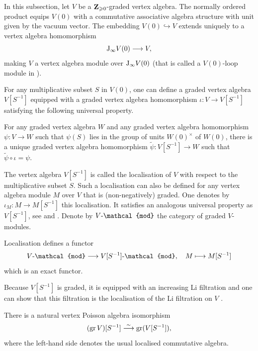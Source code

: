 In this subsection, let $V$ be a $\mathbf{Z}_{\geqslant 0}$-graded vertex algebra. The normally ordered product equips $V(0)$ with a commutative associative algebra structure with unit given by the vacuum vector. The embedding $V(0) \hookrightarrow V$ extends uniquely to a vertex algebra homomorphism
\[ \mathrm{J}_\infty V(0) \longrightarrow V, \]
making $V$ a vertex algebra module over $\mathrm{J}_\infty V(0)$ (that is called a $V(0)$-loop module in \cite{borisov2001vertex}).

\begin{theorem} \label{theorem:borisov-localisation}
	For any multiplicative subset $S$ in $V(0)$, one can define a graded vertex algebra $V[S^{-1}]$ equipped with a graded vertex algebra homomorphism $\iota \colon V \rightarrow V[S^{-1}]$ satisfying the following universal property. 
	
	For any graded vertex algebra $W$ and any graded vertex algebra homomorphism $\psi \colon V \rightarrow W$ such that $\psi(S)$ lies in the group of units $W(0)^\times$ of $W(0)$, there is a unique graded vertex algebra homomorphism $\widetilde{\psi} \colon V[S^{-1}] \rightarrow W$ such that $\widetilde{\psi} \circ \iota = \psi$.	
\end{theorem}

The vertex algebra $V[S^{-1}]$ is called the localisation of $V$ with respect to the multiplicative subset $S$. Such a localisation can also be defined for any vertex algebra module $M$ over $V$ that is (non-negatively) graded. One denotes by $\iota_M \colon M \rightarrow M[S^{-1}]$ this localisation. It satisfies an analogous universal property as $V[S^{-1}]$, see \cite[Proposition 2.3]{borisov2001vertex} and \cite[Proposition 3.2]{arakawa2026faithful}. Denote by $V\text{\rm{-}}\mathcal{mod}$ the category of graded $V$-modules.

\begin{proposition}
	Localisation defines a functor
	\[ V\text{\rm{-}}\mathcal{mod} \longrightarrow V[S^{-1}]\text{\rm{-}}\mathcal{mod}, \quad M \longmapsto M[S^{-1}] \]
	which is an exact functor.
\end{proposition}

Because $V[S^{-1}]$ is graded, it is equipped with an increasing Li filtration and one can show that this filtration is the localisation of the Li filtration on $V$ \cite[Equation (3.10)]{arakawa2026faithful}.

\begin{proposition}  \label{proposition:gr-borisov-localisation}
	There is a natural vertex Poisson algebra isomorphism
	\[ (\operatorname{gr} V)[S^{-1}] \overset{\sim}{\longrightarrow} \operatorname{gr}(V[S^{-1}]), \]
	where the left-hand side denotes the usual localised commutative algebra.
\end{proposition}

